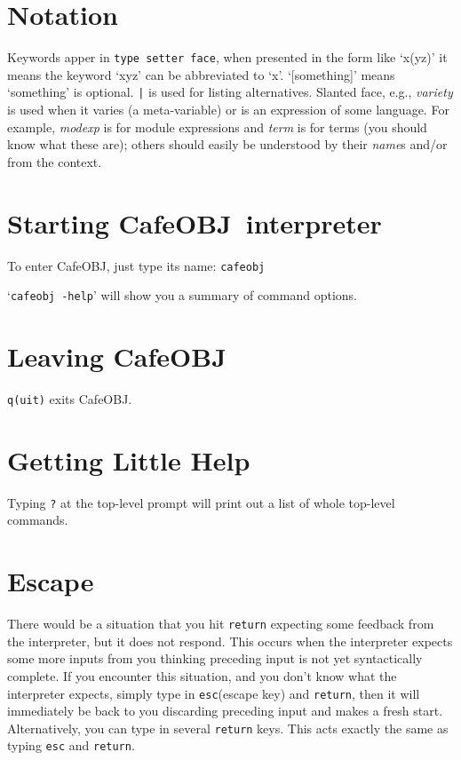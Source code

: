\documentclass[a4paper,oneside,twocolumn]{memoir}
\def\<#1>{\textit{#1\/}}
\def\kbd#1{\texttt{#1}\null}        %
\def\cafeobj{{CafeOBJ}\null}
\begin{document}
\midsloppy
\mainmatter



\section{Notation}

Keywords apper in \kbd{type setter face},
when presented in the form like `x(yz)' it means the keyword `xyz'
can be abbreviated to `x'.
`[something]' means `something' is optional.
\kbd{|} is used for listing alternatives.
Slanted face, e.g., \<variety> is used when it varies (a
meta-variable) or is an expression of some language. For example,
\<modexp> is for module expressions and \<term> is for terms (you
should know what these are); others should easily be understood by
their \<name>s and/or from the context. 
\section{Starting \cafeobj\ interpreter}

To enter \cafeobj, just type its name: \kbd{cafeobj}

`\kbd{cafeobj -help}' will show you a summary of command options. 

\section{Leaving \cafeobj}

\kbd{q(uit)} exits \cafeobj.

\section{Getting Little Help}

Typing \kbd{?} at the top-level prompt will print out a list of whole
top-level commands.

\section{Escape}

There would be a situation that you hit \kbd{return} expecting some feedback from the interpreter, but it does not respond. 
This occurs when the interpreter expects some more inputs from you thinking
preceding input is not yet syntactically complete. If you encounter this situation, 
and you don't know what the interpreter expects, 
simply type in \kbd{esc}(escape key) and \kbd{return}, then it will
immediately be back to you discarding preceding input
and makes a fresh start. Alternatively, you can type in several \kbd{return} keys. This acts exactly the same as typing \kbd{esc} and \kbd{return}. 
\end{document}
